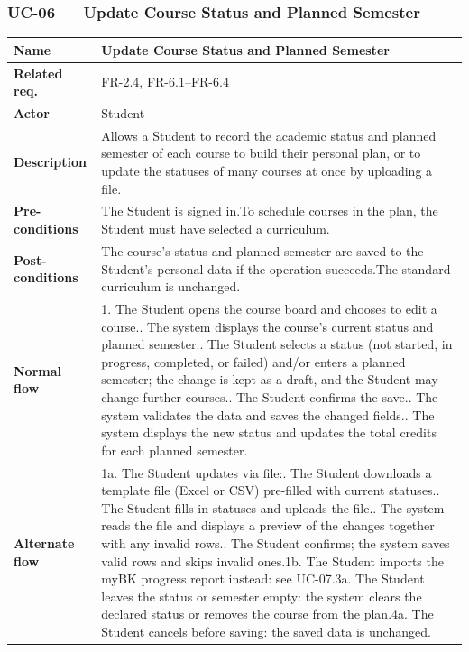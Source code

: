 \subsubsection{UC-06 --- Update Course Status and Planned Semester}
\begin{longtable}{|p{}|p{}|}
\hline
\textbf{Name} & Update Course Status and Planned Semester \\
\hline
\textbf{Related req.} & FR-2.4, FR-6.1--FR-6.4 \\
\hline
\textbf{Actor} & Student \\
\hline
\textbf{Description} & Allows a Student to record the academic status and planned semester of each course to build their personal plan, or to update the statuses of many courses at once by uploading a file. \\
\hline
\textbf{Pre-conditions} & The Student is signed in.\newline To schedule courses in the plan, the Student must have selected a curriculum. \\
\hline
\textbf{Post-conditions} & The course's status and planned semester are saved to the Student's personal data if the operation succeeds.\newline The standard curriculum is unchanged. \\
\hline
\textbf{Normal flow} & 1. The Student opens the course board and chooses to edit a course.\newline 2. The system displays the course's current status and planned semester.\newline 3. The Student selects a status (not started, in progress, completed, or failed) and/or enters a planned semester; the change is kept as a draft, and the Student may change further courses.\newline 4. The Student confirms the save.\newline 5. The system validates the data and saves the changed fields.\newline 6. The system displays the new status and updates the total credits for each planned semester. \\
\hline
\textbf{Alternate flow} & 1a. The Student updates via file:\newline \quad 1. The Student downloads a template file (Excel or CSV) pre-filled with current statuses.\newline \quad 2. The Student fills in statuses and uploads the file.\newline \quad 3. The system reads the file and displays a preview of the changes together with any invalid rows.\newline \quad 4. The Student confirms; the system saves valid rows and skips invalid ones.\newline 1b. The Student imports the myBK progress report instead: see UC-07.\newline 3a. The Student leaves the status or semester empty: the system clears the declared status or removes the course from the plan.\newline 4a. The Student cancels before saving: the saved data is unchanged. \\

\end{longtable}

